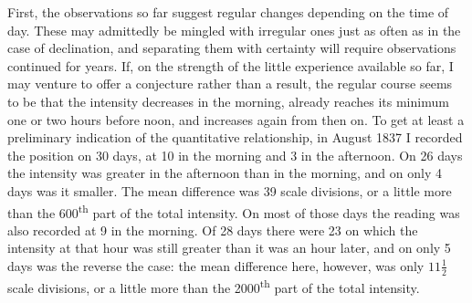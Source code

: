 First, the observations so far suggest regular changes depending on the time of day. These may admittedly be mingled with irregular ones just as often as in the case of declination, and separating them with certainty will require observations continued for years. If, on the strength of the little experience available so far, I may venture to offer a conjecture rather than a result, the regular course seems to be that the intensity decreases in the morning, already reaches its minimum one or two hours before noon, and increases again from then on. To get at least a preliminary indication of the quantitative relationship, in August 1837 I recorded the position on 30 days, at 10 in the morning and 3 in the afternoon. On 26 days the intensity was greater in the afternoon than in the morning, and on only 4 days was it smaller. The mean difference was 39 scale divisions, or a little more than the 600\textsuperscript{th} part of the total intensity. On most of those days the reading was also recorded at 9 in the morning. Of 28 days there were 23 on which the intensity at that hour was still greater than it was an hour later, and on only 5 days was the reverse the case: the mean difference here, however, was only $11\frac{1}{2}$ scale divisions, or a little more than the 2000\textsuperscript{th} part of the total intensity.

